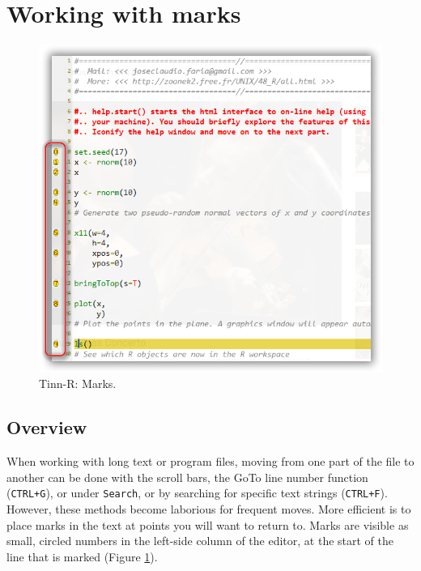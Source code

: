 
\hypertarget{working_marks}{}
\section{Working with marks}

\begin{figure}[H]
  \begin{center}
    \includegraphics[scale=0.60]{./res/marks.png}
  \end{center}
  \caption{Tinn-R: Marks.}
  \label{fig:tinn-r_marks}
\end{figure}

\subsection{Overview}
When working with long text or program files, moving from one part of the file to another can
be done with the scroll bars, the GoTo line number function (\texttt{CTRL+G}), or under \texttt{Search},
or by searching for specific text strings (\texttt{CTRL+F}).
However, these methods become laborious for frequent moves.
More efficient is to place marks in the text at points you will want to return to.
Marks are visible as small, circled numbers in the left-side column of the editor,
at the start of the line that is marked (Figure \ref{fig:tinn-r_marks}).

